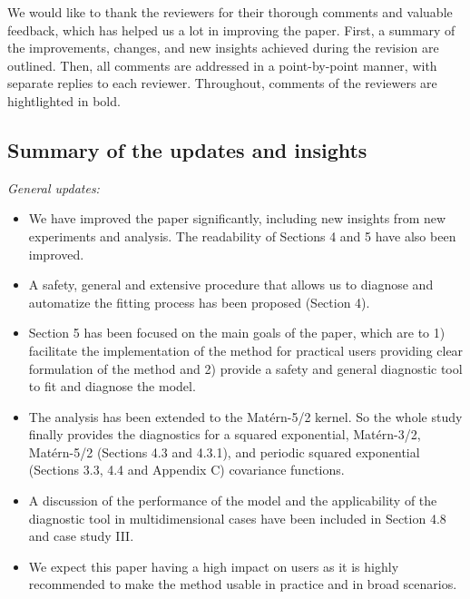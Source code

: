 \documentclass[11pt]{report}
\begin{document}
We would like to thank the reviewers for their thorough comments and valuable feedback, which has helped us a lot in improving the paper. First, a summary of the improvements, changes, and new insights achieved during the revision are outlined. Then, all comments are addressed in a point-by-point manner, with separate replies to each reviewer. 
Throughout, comments of the reviewers are hightlighted in bold.

\noindent \hdashrule{12.5cm}{0.2pt}{2mm 1pt}

\subsection*{Summary of the updates and insights}

\textit{General updates:}

\begin{itemize}

\item We have improved the paper significantly, including new insights from new experiments and analysis. The readability of Sections 4 and 5 have also been improved. 

\item A safety, general and extensive procedure that allows us to diagnose and automatize the fitting process has been proposed (Section 4). 

\item Section 5 has been focused on the main goals of the paper, which are to 1) facilitate the implementation of the method for practical users providing clear formulation of the method and 2) provide a safety and general diagnostic tool to fit and diagnose the model. 

\item The analysis has been extended to the Mat\'ern-5/2 kernel. So the whole study finally provides the diagnostics for a squared exponential, Mat\'ern-3/2, Mat\'ern-5/2 (Sections 4.3 and 4.3.1), and periodic squared exponential (Sections 3.3, 4.4 and Appendix C) covariance functions. 

\item A discussion of the performance of the model and the applicability of the diagnostic tool in multidimensional cases have been included in Section 4.8 and case study III.

\item We expect this paper having a high impact on users as it is highly recommended to make the method usable in practice and in broad scenarios.

\end{itemize}
\end{document}
